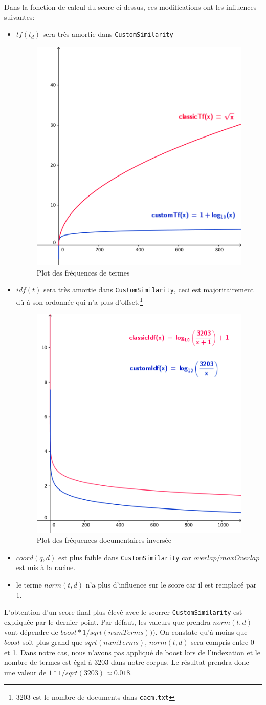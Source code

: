 Dans la fonction de calcul du score ci-dessus, ces modifications ont les influences suivantes: \\

\begin{itemize}
  \item $tf(t_{d})$ sera très amortie dans \texttt{CustomSimilarity}
    \begin{figure}[h]
        \centering
        \includegraphics[width=0.4\linewidth]{img/tf.png}
        \caption{Plot des fréquences de termes}
        \label{tfplot}
    \end{figure}

  \item $idf(t)$ sera très amortie dans \texttt{CustomSimilarity}, ceci est majoritairement dû à son ordonnée qui n'a plus d'offset.\footnote{3203 est le nombre de documents dans \texttt{cacm.txt}}
    \begin{figure}[h]
        \centering
        \includegraphics[width=0.4\linewidth]{img/idf.png}
        \caption{Plot des fréquences documentaires inversée}
        \label{idfplot}
    \end{figure}

  \item $coord(q,d)$ est plus faible dans \texttt{CustomSimilarity} car $overlap/maxOverlap$ est mis à la racine.
  \item le terme $norm(t,d)$ n'a plus d'influence sur le score car il est remplacé par 1.\\
\end{itemize}

L'obtention d'un score final plus élevé avec le scorrer \texttt{CustomSimilarity} est expliquée par le dernier point. Par défaut, les valeurs que prendra $norm(t,d)$
vont dépendre de $boost*1/sqrt(numTerms)))$. On constate qu'à moins que $boost$ soit plus grand que $sqrt(numTerms)$, $norm(t,d)$ sera compris entre 0 et 1. Dans notre cas, nous n'avons pas appliqué de boost lors de l'indexation et le nombre de termes est égal à 3203 dans notre corpus. Le résultat prendra donc une valeur de $1*1/sqrt(3203) \approx 0.018$.
